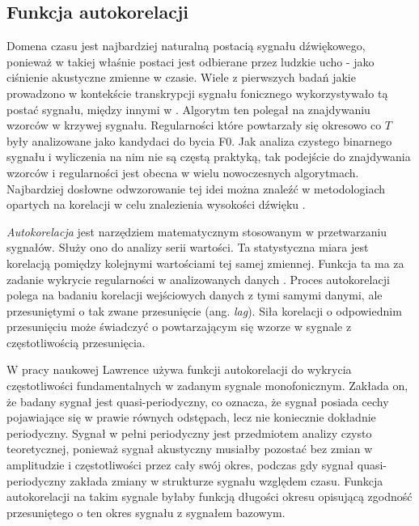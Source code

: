 \documentclass[12pt,a4paper,twoside]{mwart}
\begin{document}
\subsection{Funkcja autokorelacji}\label{sec:f0:ac}
Domena czasu jest najbardziej naturalną postacią sygnału dźwiękowego, ponieważ w takiej właśnie postaci jest odbierane przez ludzkie ucho - jako ciśnienie akustyczne zmienne w czasie. Wiele z pierwszych badań jakie prowadzono w kontekście transkrypcji sygnału fonicznego wykorzystywało tą postać sygnału, między innymi w \cite{Transcription:Gold:ComputerProgramForPitchExtraction}. Algorytm ten polegał na znajdywaniu wzorców w krzywej sygnału. Regularności które powtarzały się okresowo co $T$ były analizowane jako kandydaci do bycia F0. Jak analiza czystego binarnego sygnału i wyliczenia na nim nie są częstą praktyką, tak podejście do znajdywania wzorców i regularności jest obecna w wielu nowoczesnych algorytmach. Najbardziej dosłowne odwzorowanie tej idei można znaleźć w metodologiach opartych na korelacji w celu znalezienia wysokości dźwięku \cite[41-44]{Transcription:Quenneville:Thesis}.

\textit{Autokorelacja} jest narzędziem matematycznym stosowanym w przetwarzaniu sygnałów. Służy ono do analizy serii wartości. Ta statystyczna miara jest korelacją pomiędzy kolejnymi wartościami tej samej zmiennej. Funkcja ta ma za zadanie wykrycie regularności w analizowanych danych \cite[32-33]{CyfrowePrzetwarzanieSygnalowOdTeoriiDoZastosowan}. Proces autokorelacji polega na badaniu korelacji wejściowych danych z tymi samymi danymi, ale przesuniętymi o tak zwane przesunięcie (ang. \textit{lag}). Siła korelacji o odpowiednim przesunięciu może świadczyć o powtarzającym się wzorze w sygnale z częstotliwością przesunięcia.

W pracy naukowej \cite{Transcription:Lawrence:AutocorrelationForPitchDetection} Lawrence używa funkcji autokorelacji do wykrycia częstotliwości fundamentalnych w zadanym sygnale monofonicznym. Zakłada on, że badany sygnał jest quasi-periodyczny, co oznacza, że sygnał posiada cechy pojawiające się w prawie równych odstępach, lecz nie koniecznie dokładnie periodyczny. Sygnał w pełni periodyczny jest przedmiotem analizy czysto teoretycznej, ponieważ sygnał akustyczny musiałby pozostać bez zmian w amplitudzie i częstotliwości przez cały swój okres, podczas gdy sygnał quasi-periodyczny zakłada zmiany w strukturze sygnału względem czasu. Funkcja autokorelacji na takim sygnale byłaby funkcją długości okresu opisującą zgodność przesuniętego o ten okres sygnału z sygnałem bazowym. 
\end{document}
